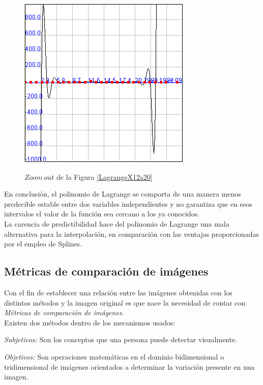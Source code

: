 \documentclass[a4paper]{article}
\begin{document}
\begin{figure}
	\caption{$Zoom \ out$ de la Figura \ref{LagrangeX12a20}}
	\begin{center}
	\includegraphics[scale=1]{imagenes/LagrangeX12a20(zoomOut)}
	\label{LagrangeX12a20(zoomOut)}
  \end{center}
\end{figure}

\bigskip

\newpage
En conclusión, el polinomio de Lagrange se comporta de una manera menos predecible estable entre dos variables independientes y no garantiza que en esos intervalos el valor de la función sea cercano a los ya conocidos.\\
La carencia de predictibilidad hace del polinomio de Lagrange una mala alternativa para la interpolación, en comparación con las ventajas proporcionadas por el empleo de Splines.\\




\newpage
\subsection{M\'etricas de comparaci\'on de im\'agenes}

Con el fin de establecer una relaci\'on entre las im\'agenes obtenidas con los distintos m\'etodos y la imagen original es que nace la necesidad de contar con \emph{M\'etricas de comparaci\'on de im\'agenes}.\\

Existen dos m\'etodos dentro de los mecanismos usados:

\emph{Subjetivos:} Son los conceptos que una persona puede detectar visualmente.

\emph{Objetivos:} Son operaciones matem\'aticas en el dominio bidimensional o tridimensional de im\'agenes orientados a determinar la variaci\'on presente en una imagen.\\
\end{document}
